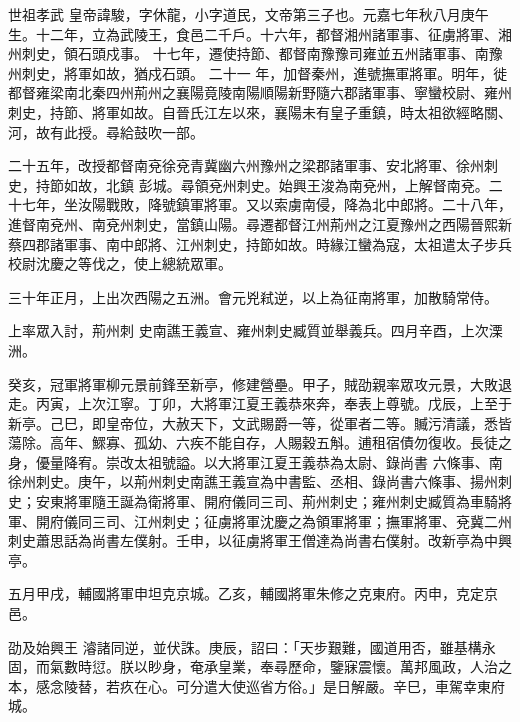 
\begin{pinyinscope}

 世祖孝武
 皇帝諱駿，字休龍，小字道民，文帝第三子也。元嘉七年秋八月庚午生。十二年，立為武陵王，食邑二千戶。十六年，都督湘州諸軍事、征虜將軍、湘州刺史，領石頭戍事。
 十七年，遷使持節、都督南豫豫司雍並五州諸軍事、南豫州刺史，將軍如故，猶戍石頭。
 二十一
 年，加督秦州，進號撫軍將軍。明年，徙都督雍梁南北秦四州荊州之襄陽竟陵南陽順陽新野隨六郡諸軍事、寧蠻校尉、雍州刺史，持節、將軍如故。自晉氏江左以來，襄陽未有皇子重鎮，時太祖欲經略關、河，故有此授。尋給鼓吹一部。



 二十五年，改授都督南兗徐兗青冀幽六州豫州之梁郡諸軍事、安北將軍、徐州刺史，持節如故，北鎮
 彭城。尋領兗州刺史。始興王浚為南兗州，上解督南兗。二十七年，坐汝陽戰敗，降號鎮軍將軍。又以索虜南侵，降為北中郎將。二十八年，進督南兗州、南兗州刺史，當鎮山陽。尋遷都督江州荊州之江夏豫州之西陽晉熙新蔡四郡諸軍事、南中郎將、江州刺史，持節如故。時緣江蠻為寇，太祖遣太子步兵校尉沈慶之等伐之，使上總統眾軍。



 三十年正月，上出次西陽之五洲。會元兇弒逆，以上為征南將軍，加散騎常侍。



 上率眾入討，荊州刺
 史南譙王義宣、雍州刺史臧質並舉義兵。四月辛酉，上次溧洲。



 癸亥，冠軍將軍柳元景前鋒至新亭，修建營壘。甲子，賊劭親率眾攻元景，大敗退走。丙寅，上次江寧。丁卯，大將軍江夏王義恭來奔，奉表上尊號。戊辰，上至于新亭。己巳，即皇帝位，大赦天下，文武賜爵一等，從軍者二等。贓污清議，悉皆蕩除。高年、鰥寡、孤幼、六疾不能自存，人賜穀五斛。逋租宿債勿復收。長徒之身，優量降宥。崇改太祖號謚。以大將軍江夏王義恭為太尉、錄尚書
 六條事、南徐州刺史。庚午，以荊州刺史南譙王義宣為中書監、丞相、錄尚書六條事、揚州刺史；安東將軍隨王誕為衛將軍、開府儀同三司、荊州刺史；雍州刺史臧質為車騎將軍、開府儀同三司、江州刺史；征虜將軍沈慶之為領軍將軍；撫軍將軍、兗冀二州刺史蕭思話為尚書左僕射。壬申，以征虜將軍王僧達為尚書右僕射。改新亭為中興亭。



 五月甲戌，輔國將軍申坦克京城。乙亥，輔國將軍朱修之克東府。丙申，克定京邑。



 劭及始興王
 濬諸同逆，並伏誅。庚辰，詔曰：「天步艱難，國道用否，雖基構永固，而氣數時愆。朕以眇身，奄承皇業，奉尋歷命，鑒寐震懷。萬邦風政，人治之本，感念陵替，若疚在心。可分遣大使巡省方俗。」是日解嚴。辛巳，車駕幸東府城。




\end{pinyinscope}
